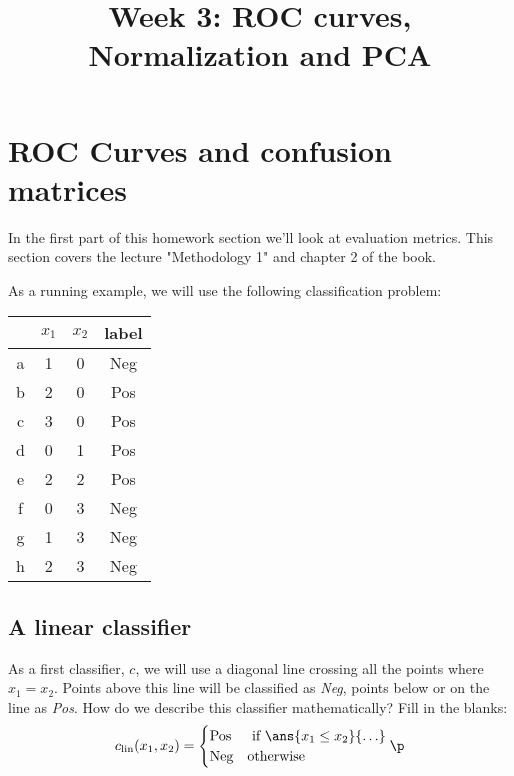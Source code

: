\documentclass[11pt]{article}
\title{Week 3: ROC curves, Normalization and PCA}
\begin{document}
\maketitle
\section{ROC Curves and confusion matrices}

In the first part of this homework section we'll look at evaluation metrics. This section covers the lecture "Methodology 1" and chapter 2 of the book. 

As a running example, we will use the following classification problem:

\begin{center}
	\begin{tabular}{c c c c}
		& $x_1$ & $x_2$ & label\\
		\hline
		a & 1 & 0 & Neg \\
		b & 2 & 0 & Pos \\
		c & 3 & 0 & Pos \\
		d & 0 & 1 & Pos \\
		e & 2 & 2 & Pos \\
		f & 0 & 3 & Neg \\
		g & 1 & 3 & Neg \\
		h & 2 & 3 & Neg \\
		\hline
	\end{tabular}
\end{center}

\subsection{A linear classifier}
	As a first classifier, $c$, we will use a diagonal line crossing all the points where $x_1 = x_2$. Points above this line will be classified as \emph{Neg}, points below or on the line as \emph{Pos}. How do we describe this classifier mathematically? Fill in the blanks:
	\[
	c_\text{lin}(x_1, x_2) = \begin{cases} \text{Pos} & \text{ if } \ans{x_1 \leq x_2}{\ldots} \\ \text{Neg} & \text{otherwise}\end{cases}\p
	\]
	
\end{document}
